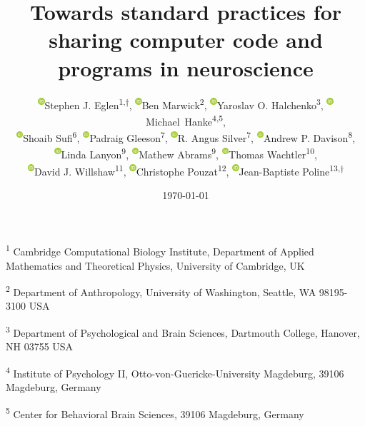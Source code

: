 \documentclass[11pt]{article}
\begin{document}
\onehalfspacing

\newcommand{\orcid}[1]{\textsuperscript{\href{https://orcid.org/#1}
  {\includegraphics[width=2.5mm]{orcid_128x128.png}}}}

\title{Towards standard practices for sharing computer code and programs in neuroscience}

\author{\orcid{0000-0001-8607-8025}Stephen J. Eglen\textsuperscript{1,$\dagger$}, 
  \orcid{0000-0001-7879-4531}Ben Marwick\textsuperscript{2}, 
  \orcid{0000-0003-3456-2493}Yaroslav O. Halchenko\textsuperscript{3}, 
  \orcid{0000-0001-6398-6370}Michael~Hanke\textsuperscript{4,5},
  \\
  \orcid{0000-0001-6390-2616}Shoaib Sufi\textsuperscript{6},
  \orcid{0000-0001-5963-8576}Padraig Gleeson\textsuperscript{7}, 
  \orcid{0000-0002-5480-6638}R. Angus Silver\textsuperscript{7},
  \orcid{0000-0002-4793-7541}Andrew P. Davison\textsuperscript{8},
  \\
  \orcid{0000-0002-0885-1825}Linda Lanyon\textsuperscript{9},
  \orcid{0000-0001-9438-9691}Mathew Abrams\textsuperscript{9},
  \orcid{0000-0003-2015-6590}Thomas Wachtler\textsuperscript{10},
  \\
  \orcid{0000-0003-3814-7529}David J. Willshaw\textsuperscript{11},
  \orcid{0000-0002-2844-8099}Christophe Pouzat\textsuperscript{12},
  \orcid{0000-0002-9794-749X}Jean-Baptiste Poline\textsuperscript{13,$\dagger$}}
\date{\today}
\maketitle

\noindent \textsuperscript{1}
Cambridge Computational Biology Institute,
Department of Applied Mathematics and Theoretical Physics,
University of Cambridge, UK

\noindent \textsuperscript{2}
Department of Anthropology,
University of Washington,
Seattle, WA 98195-3100 USA 

\noindent \textsuperscript{3}
Department of Psychological and Brain Sciences,
Dartmouth College,
Hanover, NH 03755 USA

\noindent \textsuperscript{4}
Institute of Psychology II, Otto-von-Guericke-University Magdeburg, 39106 Magdeburg, Germany

\noindent \textsuperscript{5}
Center for Behavioral Brain Sciences, 39106 Magdeburg, Germany
\end{document}
